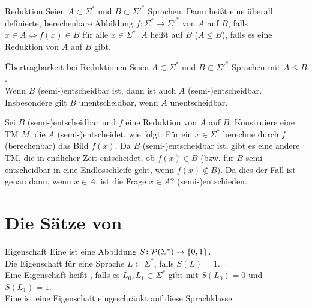 \begin{Def}{Reduktion}
    Seien $A \subset \Sigma^\ast$ und $B \subset \Sigma'^\ast$ Sprachen.
    Dann heißt eine überall definierte, berechenbare Abbildung
    $f\colon \Sigma^\ast \rightarrow \Sigma'^\ast$  von $A$ auf $B$, falls
    $x \in A \iff f(x) \in B$ für alle $x \in \Sigma^\ast$.
    $A$ heißt auf $B$  ($A \le B$), falls es eine Reduktion von $A$ auf $B$
    gibt.
\end{Def}

\begin{Satz}{Übertragbarkeit bei Reduktionen}
    Seien $A \subset \Sigma^\ast$ und $B \subset \Sigma'^\ast$ Sprachen mit $A \le B$.\\
    Wenn $B$ (semi-)entscheidbar ist, dann ist auch $A$ (semi-)entscheidbar.\\
    Insbesondere gilt $B$ unentscheidbar, wenn $A$ unentscheidbar.
\end{Satz}

\begin{Beweis}
    Sei $B$ (semi-)entscheidbar und $f$ eine Reduktion von $A$ auf $B$.
    Konstruiere eine TM $M$, die $A$ (semi-)entscheidet, wie folgt:
    Für ein $x \in \Sigma^\ast$ berechne durch $f$ (berechenbar) das Bild $f(x)$.
    Da $B$ (semi-)entscheidbar ist, gibt es eine andere TM, die in endlicher Zeit entscheidet,
    ob $f(x) \in B$ (bzw. für $B$ semi-entscheidbar in eine Endlosschleife geht,
    wenn $f(x) \notin B$).
    Da dies der Fall ist genau dann, wenn $x \in A$, ist die Frage $x \in A?$ (semi-)entschieden.
\end{Beweis}

\section{%
    Die Sätze von %
}

\begin{Def}{Eigenschaft}
    Eine  ist eine Abbildung
    $S\colon \mathcal{P}(\Sigma^\ast) \rightarrow \{0, 1\}$.\\
    Die Eigenschaft  für eine Sprache $L \subset \Sigma^\ast$, falls $S(L) = 1$.\\
    Eine Eigenschaft heißt , falls es $L_0, L_1 \subset \Sigma^\ast$ gibt
    mit $S(L_0) = 0$ und $S(L_1) = 1$.\\
    Eine  ist eine Eigenschaft
    eingeschränkt auf diese Sprachklasse.
\end{Def}

